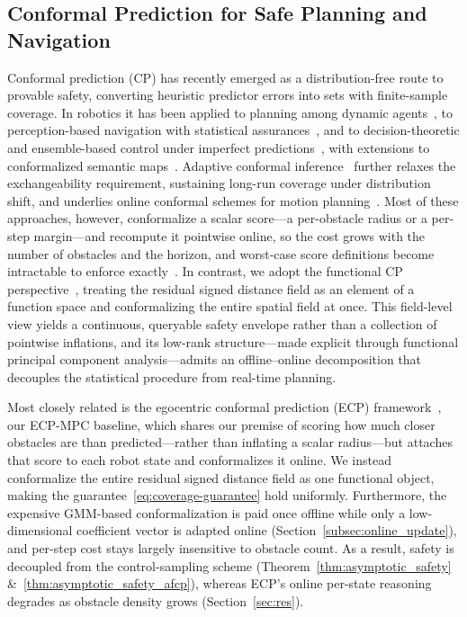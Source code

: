 \documentclass[lettersize,journal]{IEEEtran}
\begin{document}
\subsection{Conformal Prediction for Safe Planning and Navigation}
Conformal prediction (CP) has recently emerged as a distribution-free route to provable safety, converting heuristic predictor errors into sets with finite-sample coverage. In robotics it has been applied to planning among dynamic agents~\cite{lindemann2023safeplanning,dixit2023adaptive}, to perception-based navigation with statistical assurances~\cite{mei2025perceive}, and to decision-theoretic and ensemble-based control under imperfect predictions~\cite{lekeufack2024decision,contreras2025safe}, with extensions to conformalized semantic maps~\cite{sundarsingh2026safe}. Adaptive conformal inference~\cite{gibbs2021adaptive} further relaxes the exchangeability requirement, sustaining long-run coverage under distribution shift, and underlies online conformal schemes for motion planning~\cite{dixit2023adaptive}. Most of these approaches, however, conformalize a scalar score—a per-obstacle radius or a per-step margin—and recompute it pointwise online, so the cost grows with the number of obstacles and the horizon, and worst-case score definitions become intractable to enforce exactly~\cite{mei2025perceive,sundarsingh2026safe}. In contrast, we adopt the functional CP perspective~\cite{lei2015conformal}, treating the residual signed distance field as an element of a function space and conformalizing the entire spatial field at once. This field-level view yields a continuous, queryable safety envelope rather than a collection of pointwise inflations, and its low-rank structure—made explicit through functional principal component analysis—admits an offline–online decomposition that decouples the statistical procedure from real-time planning.

Most closely related is the egocentric conformal prediction (ECP) framework~\cite{shin2025egocentric}, our ECP-MPC baseline, which shares our premise of scoring how much closer obstacles are than predicted—rather than inflating a scalar radius—but attaches that score to each robot state and conformalizes it online. We instead conformalize the entire residual signed distance field as one functional object, making the guarantee~\eqref{eq:coverage-guarantee} hold uniformly. Furthermore, the expensive GMM-based conformalization is paid once offline while only a low-dimensional coefficient vector is adapted online (Section~\ref{subsec:online_update}), and per-step cost stays largely insensitive to obstacle count. As a result, safety is decoupled from the control-sampling scheme (Theorem~\ref{thm:asymptotic_safety} \&~\ref{thm:asymptotic_safety_afcp}), whereas ECP's online per-state reasoning degrades as obstacle density grows (Section~\ref{sec:res}).
\end{document}

